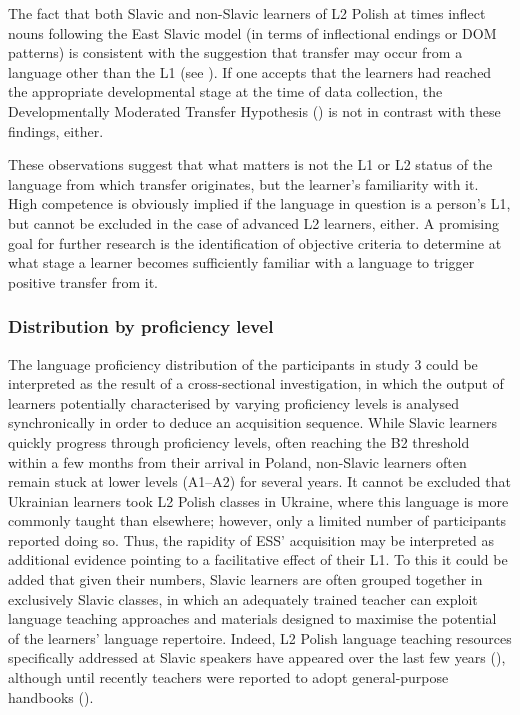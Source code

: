 \documentclass[output=paper,            colorlinks, citecolor=brown            		  ]{langscibook}
\begin{document}
The fact that both Slavic and non-Slavic learners of L2 Polish at times inflect nouns following the East Slavic model (in terms of inflectional endings or DOM patterns) is consistent with the suggestion that transfer may occur from a language other than the L1 (see ). If one accepts that the learners had reached the appropriate developmental stage at the time of data collection, the Developmentally Moderated Transfer Hypothesis () is not in contrast with these findings, either.

These observations suggest that what matters is not the L1 or L2 status of the language from which transfer originates, but the learner’s familiarity with it. High competence is obviously implied if the language in question is a person’s L1, but cannot be excluded in the case of advanced L2 learners, either. A promising goal for further research is the identification of objective criteria to determine at what stage a learner becomes sufficiently familiar with a language to trigger positive transfer from it.

\subsubsection{Distribution by proficiency level}\label{sec:saturno:4.1.2}

The language proficiency distribution of the participants in study 3 could be interpreted as the result of a cross-sectional investigation, in which the output of learners potentially characterised by varying proficiency levels is analysed synchronically in order to deduce an acquisition sequence. While Slavic learners quickly progress through proficiency levels, often reaching the B2 threshold within a few months from their arrival in Poland, non-Slavic learners often remain stuck at lower levels (A1--A2) for several years. It cannot be excluded that Ukrainian learners took L2 Polish classes in Ukraine, where this language is more commonly taught than elsewhere; however, only a limited number of participants reported doing so. Thus, the rapidity of ESS’ acquisition may be interpreted as additional evidence pointing to a facilitative effect of their L1. To this it could be added that given their numbers, Slavic learners are often grouped together in exclusively Slavic classes, in which an adequately trained teacher can exploit language teaching approaches and materials designed to maximise the potential of the learners’ language repertoire. Indeed, L2 Polish language teaching resources specifically addressed at Slavic speakers have appeared over the last few years (\citealt{KołakEtAl2015, Izdebska-Dlugosz2017,Izdebska-Długosz2021b}), although until recently teachers were reported to adopt general-purpose handbooks (\citealt{Gębka-Wolak2018}).
\end{document}
